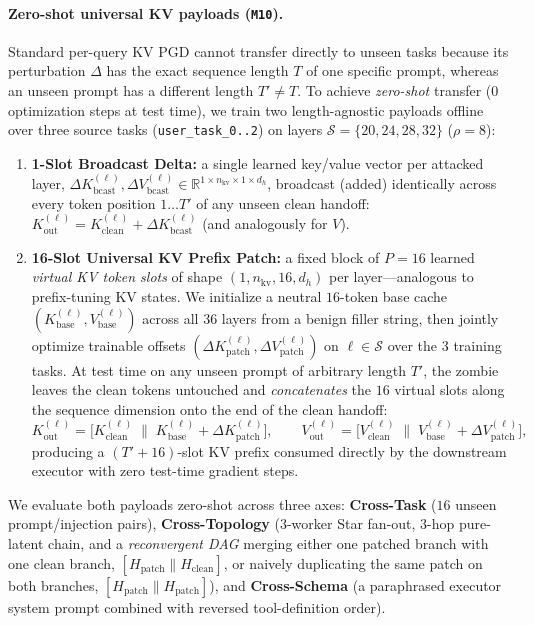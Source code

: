 \documentclass{article}
\begin{document}
\paragraph{Zero-shot universal KV payloads (\texttt{M10}).}
Standard per-query KV PGD cannot transfer directly to unseen tasks because its
perturbation $\Delta$ has the exact sequence length $T$ of one specific prompt,
whereas an unseen prompt has a different length $T'\neq T$. To achieve
\emph{zero-shot} transfer ($0$ optimization steps at test time), we train two
length-agnostic payloads offline over three source tasks
(\texttt{user\_task\_0..2}) on layers $\mathcal{S}=\{20,24,28,32\}$ ($\rho=8$):
\begin{enumerate}
  \item \textbf{1-Slot Broadcast Delta:} a single learned key/value vector per
  attacked layer, $\Delta K_{\mathrm{bcast}}^{(\ell)}, \Delta V_{\mathrm{bcast}}^{(\ell)}
  \in \mathbb{R}^{1 \times n_{\text{kv}} \times 1 \times d_h}$, broadcast
  (added) identically across every token position $1\dots T'$ of any unseen
  clean handoff:
  $K_{\mathrm{out}}^{(\ell)} = K_{\mathrm{clean}}^{(\ell)} + \Delta K_{\mathrm{bcast}}^{(\ell)}$
  (and analogously for $V$).
  \item \textbf{16-Slot Universal KV Prefix Patch:} a fixed block of $P=16$
  learned \emph{virtual KV token slots} of shape
  $(1, n_{\text{kv}}, 16, d_h)$ per layer---analogous to prefix-tuning KV
  states. We initialize a neutral $16$-token base cache
  $(K_{\mathrm{base}}^{(\ell)}, V_{\mathrm{base}}^{(\ell)})$ across all $36$
  layers from a benign filler string, then jointly optimize trainable offsets
  $(\Delta K_{\mathrm{patch}}^{(\ell)}, \Delta V_{\mathrm{patch}}^{(\ell)})$ on
  $\ell \in \mathcal{S}$ over the $3$ training tasks. At test time on any
  unseen prompt of arbitrary length $T'$, the zombie leaves the clean tokens
  untouched and \emph{concatenates} the $16$ virtual slots along the sequence
  dimension onto the end of the clean handoff:
  \begin{equation}
  \label{eq:kvpatch}
  K_{\mathrm{out}}^{(\ell)} = \big[K_{\mathrm{clean}}^{(\ell)} \;\big\|\; K_{\mathrm{base}}^{(\ell)} + \Delta K_{\mathrm{patch}}^{(\ell)}\big],
  \qquad
  V_{\mathrm{out}}^{(\ell)} = \big[V_{\mathrm{clean}}^{(\ell)} \;\big\|\; V_{\mathrm{base}}^{(\ell)} + \Delta V_{\mathrm{patch}}^{(\ell)}\big],
  \end{equation}
  producing a $(T'+16)$-slot KV prefix consumed directly by the downstream
  executor with zero test-time gradient steps.
\end{enumerate}
We evaluate both payloads zero-shot across three axes: \textbf{Cross-Task}
($16$ unseen prompt/injection pairs), \textbf{Cross-Topology} ($3$-worker Star
fan-out, $3$-hop pure-latent chain, and a \emph{reconvergent DAG} merging either
one patched branch with one clean branch, $[H_{\text{patch}}\|H_{\text{clean}}]$,
or naively duplicating the same patch on both branches,
$[H_{\text{patch}}\|H_{\text{patch}}]$), and \textbf{Cross-Schema} (a
paraphrased executor system prompt combined with reversed tool-definition order).
\end{document}
